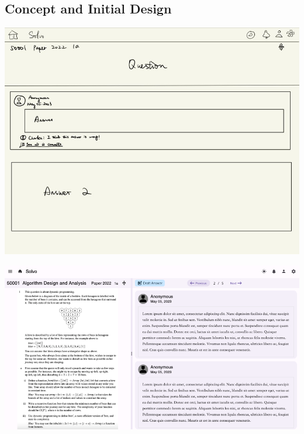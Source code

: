 \documentclass[a4paper]{article}
\begin{document}
    \subsection*{Concept and Initial Design}
    \noindent \begin{minipage}{0.4\textwidth}
        \centering
        \includegraphics[width=\textwidth]{concept2}
    \end{minipage}\hspace{0.05\textwidth}
    \begin{minipage}{0.57\textwidth}
        \centering
        \includegraphics[width=\textwidth]{question-page2}
    \end{minipage}
\end{document}
